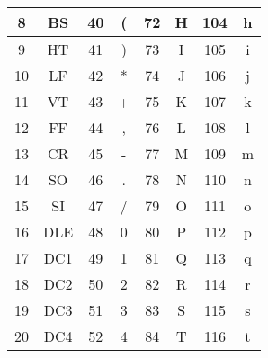\begin{longtable}{|c|c|c|c|c|c|c|c|}
	\hline
	8              & BS            & 40             & (             & 72             & H                      & 104            & h                      \\
	\hline
	9              & HT            & 41             & )             & 73             & I                      & 105            & i                      \\
	\hline
	10             & LF            & 42             & *             & 74             & J                      & 106            & j                      \\
	\hline
	11             & VT            & 43             & +             & 75             & K                      & 107            & k                      \\
	\hline
	12             & FF            & 44             & ,             & 76             & L                      & 108            & l                      \\
	\hline
	13             & CR            & 45             & -             & 77             & M                      & 109            & m                      \\
	\hline
	14             & SO            & 46             & .             & 78             & N                      & 110            & n                      \\
	\hline
	15             & SI            & 47             & /             & 79             & O                      & 111            & o                      \\
	\hline
	16             & DLE           & 48             & 0             & 80             & P                      & 112            & p                      \\
	\hline
	17             & DC1           & 49             & 1             & 81             & Q                      & 113            & q                      \\
	\hline
	18             & DC2           & 50             & 2             & 82             & R                      & 114            & r                      \\
	\hline
	19             & DC3           & 51             & 3             & 83             & S                      & 115            & s                      \\
	\hline
	20             & DC4           & 52             & 4             & 84             & T                      & 116            & t                      \\

\end{longtable}
